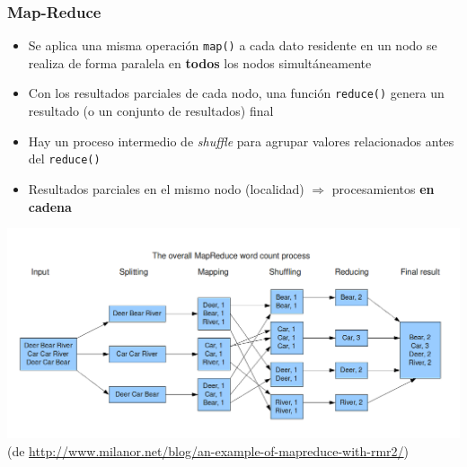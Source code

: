 \documentclass[14pt]{beamer}
\newcommand{\ra}{{\color{mdwrojo} $\Rightarrow${}~{}}}
\begin{document}
\begin{frame}
\frametitle{Map-Reduce}



\begin{itemize}
\item Se aplica una misma operación {\tt map()} a cada dato residente en un
  nodo se realiza de forma paralela en {\bf todos} los nodos
  simultáneamente
\item Con los resultados parciales de cada nodo, una función {\tt reduce()}
  genera un resultado (o un conjunto de resultados) final
\item Hay un proceso intermedio de {\em shuffle} para agrupar valores
  relacionados antes del {\tt reduce()}
\item Resultados parciales en el mismo nodo (localidad) $\Rightarrow$
  procesamientos {\bf en cadena}
\end{itemize}


\framebreak

\centering\includegraphics[width=\textwidth]{img/MapReduceWordcount}
(de \url{http://www.milanor.net/blog/an-example-of-mapreduce-with-rmr2/})
\end{frame}

\end{document}
